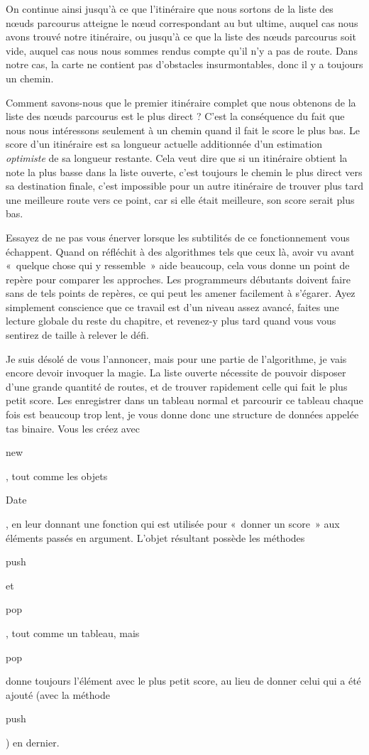 \documentclass{FramateX}
\renewcommand{\texttt}[1]{\begin{sffamily}{#1}\end{sffamily}}
\begin{document}
On continue ainsi jusqu'à ce que l'itinéraire que nous sortons de la
liste des nœuds parcourus atteigne le nœud correspondant au but ultime,
auquel cas nous avons trouvé notre itinéraire, ou jusqu'à ce que la
liste des nœuds parcourus soit vide, auquel cas nous nous sommes rendus
compte qu'il n'y a pas de route. Dans notre cas, la carte ne contient
pas d'obstacles insurmontables, donc il y a toujours un chemin.

Comment savons-nous que le premier itinéraire complet que nous obtenons
de la liste des nœuds parcourus est le plus direct ? C'est la
conséquence du fait que nous nous intéressons seulement à un chemin
quand il fait le score le plus bas. Le score d'un itinéraire est sa
longueur actuelle additionnée d'un estimation \emph{optimiste} de sa
longueur restante. Cela veut dire que si un itinéraire obtient la note
la plus basse dans la liste ouverte, c'est toujours le chemin le plus
direct vers sa destination finale, c'est impossible pour un autre
itinéraire de trouver plus tard une meilleure route vers ce point, car
si elle était meilleure, son score serait plus bas.

\begin{center}\end{center}

Essayez de ne pas vous énerver lorsque les subtilités de ce
fonctionnement vous échappent. Quand on réfléchit à des algorithmes tels
que ceux là, avoir vu avant «~quelque chose qui y ressemble~» aide
beaucoup, cela vous donne un point de repère pour comparer les
approches. Les programmeurs débutants doivent faire sans de tels points
de repères, ce qui peut les amener facilement à s'égarer. Ayez
simplement conscience que ce travail est d'un niveau assez avancé,
faites une lecture globale du reste du chapitre, et revenez-y plus tard
quand vous vous sentirez de taille à relever le défi.

\begin{center}\end{center}

Je suis désolé de vous l'annoncer, mais pour une partie de l'algorithme,
je vais encore devoir invoquer la magie. La liste ouverte nécessite de
pouvoir disposer d'une grande quantité de routes, et de trouver
rapidement celle qui fait le plus petit score. Les enregistrer dans un
tableau normal et parcourir ce tableau chaque fois est beaucoup trop
lent, je vous donne donc une structure de données appelée tas binaire.
Vous les créez avec \texttt{new}, tout comme les objets \texttt{Date},
en leur donnant une fonction qui est utilisée pour «~donner un score~»
aux éléments passés en argument. L'objet résultant possède les méthodes
\texttt{push} et \texttt{pop}, tout comme un tableau, mais \texttt{pop}
donne toujours l'élément avec le plus petit score, au lieu de donner
celui qui a été ajouté (avec la méthode \texttt{push}) en dernier.
\end{document}
